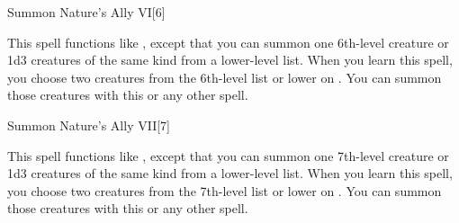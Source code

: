 \begin{spellsection}{Summon Nature's Ally VI}[6]
    \begin{spellheader}
    \end{spellheader}
    \begin{spellcontent}
        \begin{spelltargetinginfo}
        \end{spelltargetinginfo}
        \begin{spelleffects}
            \spellspecial This spell functions like , except that you can summon one 6th-level creature or 1d3 creatures of the same kind from a lower-level list. When you learn this spell, you choose two creatures from the 6th-level list or lower on . You can summon those creatures with this or any other  spell.
            \spelldur \durshort \dismissable
        \end{spelleffects}
    \end{spellcontent}
    \begin{spellfooter}
        \miscastexplode
    \end{spellfooter}
\end{spellsection}

\begin{spellsection}{Summon Nature's Ally VII}[7]
    \begin{spellheader}
    \end{spellheader}
    \begin{spellcontent}
        \begin{spelltargetinginfo}
        \end{spelltargetinginfo}
        \begin{spelleffects}
            \spellspecial This spell functions like , except that you can summon one 7th-level creature or 1d3 creatures of the same kind from a lower-level list. When you learn this spell, you choose two creatures from the 7th-level list or lower on . You can summon those creatures with this or any other  spell.
            \spelldur \durshort \dismissable
        \end{spelleffects}
    \end{spellcontent}
    \begin{spellfooter}
        \miscastexplode
    \end{spellfooter}
\end{spellsection}

